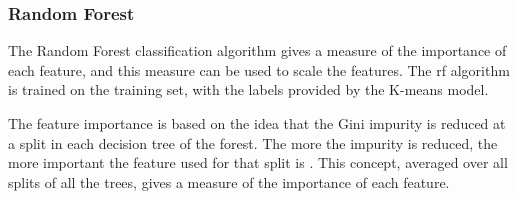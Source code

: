 \begin{table}
    \centering
    \caption{Tuned embedded models parameters}
    \label{tab:axis_models}
    \end{table}

\subsubsection{Random Forest}
The Random Forest classification algorithm gives a measure of the importance of each feature, and this measure can be used to scale the features. The \gls{rf} algorithm is trained on the training set, with the labels provided by the K-means model. 

The feature importance is based on the idea that the Gini impurity is reduced at a split in each decision tree of the forest. The more the impurity is reduced, the more important the feature used for that split is \cite{RF_featimportance}. This concept, averaged over all splits of all the trees, gives a measure of the importance of each feature.

